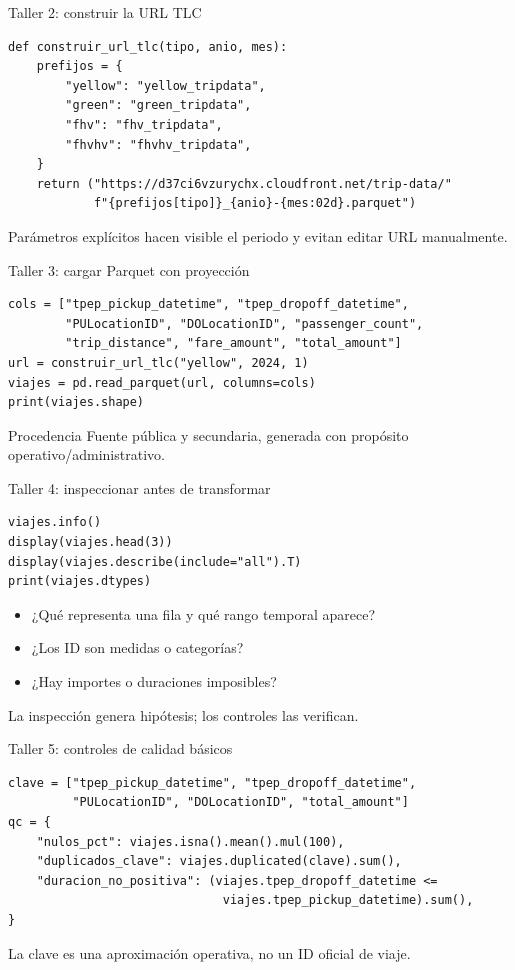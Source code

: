 \documentclass[aspectratio=169,11pt]{beamer}
\begin{document}
\begin{frame}[fragile]{Taller 2: construir la URL TLC}
\begin{verbatim}
def construir_url_tlc(tipo, anio, mes):
    prefijos = {
        "yellow": "yellow_tripdata",
        "green": "green_tripdata",
        "fhv": "fhv_tripdata",
        "fhvhv": "fhvhv_tripdata",
    }
    return ("https://d37ci6vzurychx.cloudfront.net/trip-data/"
            f"{prefijos[tipo]}_{anio}-{mes:02d}.parquet")
\end{verbatim}
  \small Parámetros explícitos hacen visible el periodo y evitan editar URL manualmente.
\end{frame}

\begin{frame}[fragile]{Taller 3: cargar Parquet con proyección}
\begin{verbatim}
cols = ["tpep_pickup_datetime", "tpep_dropoff_datetime",
        "PULocationID", "DOLocationID", "passenger_count",
        "trip_distance", "fare_amount", "total_amount"]
url = construir_url_tlc("yellow", 2024, 1)
viajes = pd.read_parquet(url, columns=cols)
print(viajes.shape)
\end{verbatim}
  \begin{block}{Procedencia}
    Fuente pública y secundaria, generada con propósito operativo/administrativo.
  \end{block}
\end{frame}

\begin{frame}[fragile]{Taller 4: inspeccionar antes de transformar}
\begin{verbatim}
viajes.info()
display(viajes.head(3))
display(viajes.describe(include="all").T)
print(viajes.dtypes)
\end{verbatim}
  \begin{itemize}
    \item ¿Qué representa una fila y qué rango temporal aparece?
    \item ¿Los ID son medidas o categorías?
    \item ¿Hay importes o duraciones imposibles?
  \end{itemize}
  \centering\alert{La inspección genera hipótesis; los controles las verifican.}
\end{frame}

\begin{frame}[fragile]{Taller 5: controles de calidad básicos}
\begin{verbatim}
clave = ["tpep_pickup_datetime", "tpep_dropoff_datetime",
         "PULocationID", "DOLocationID", "total_amount"]
qc = {
    "nulos_pct": viajes.isna().mean().mul(100),
    "duplicados_clave": viajes.duplicated(clave).sum(),
    "duracion_no_positiva": (viajes.tpep_dropoff_datetime <=
                              viajes.tpep_pickup_datetime).sum(),
}
\end{verbatim}
  \small La clave es una aproximación operativa, no un ID oficial de viaje.
\end{frame}
\end{document}
